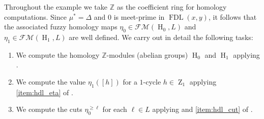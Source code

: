 \documentclass[a4paper,10pt]{article}
\newcommand{\bbz}{\mathbb{Z}}
\newcommand{\calfm}{\mathcal{F\!M}}
\DeclareMathOperator{\fdl}{FDL}
\DeclareMathOperator{\Zo}{Z}
\DeclareMathOperator{\Ho}{H}
\begin{document}
Throughout the example we take \(\bbz\) as the coefficient ring for homology computations. Since \(\mu^*=\Delta\) and \(0\) is meet-prime in \(\fdl(x,y)\), it follows that the associated fuzzy homology maps \(\eta_0 \in \calfm(\Ho_0,L)\) and \(\eta_1 \in \calfm(\Ho_1,L)\) are well defined. We carry out in detail the following tasks:
\begin{enumerate}
\item We compute the homology \(\bbz\)-modules (abelian groups) \(\Ho_0\) and \(\Ho_1\) applying .
\item We compute the value \(\eta_1([h])\) for a \(1\)-cycle \(h \in \Zo_1\) applying \cref{item:hdl_eta} of .
\item We compute the cuts \(\eta_0^{\geq \ell}\) for each \(\ell \in L\) applying  and \cref{item:hdl_cut} of .
\end{enumerate}
\end{document}
